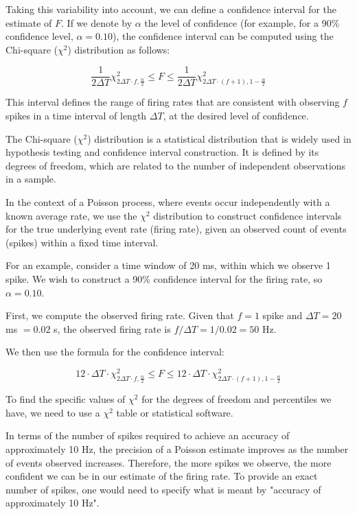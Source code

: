 Taking this variability into account, we can define a confidence interval for the estimate of $F$. If we denote by $\alpha$ the level of confidence (for example, for a 90\% confidence level, $\alpha = 0.10$), the confidence interval can be computed using the Chi-square ($\chi^2$) distribution as follows:

\begin{equation}
\frac{1}{2\Delta T} \chi^{2}_{2\Delta T \cdot f, \frac{\alpha}{2}} \leq F \leq \frac{1}{2\Delta T} \chi^{2}_{2\Delta T \cdot (f+1), 1-\frac{\alpha}{2}}
\end{equation}

This interval defines the range of firing rates that are consistent with observing $f$ spikes in a time interval of length $\Delta T$, at the desired level of confidence.




The Chi-square ($\chi^2$) distribution is a statistical distribution that is widely used in hypothesis testing and confidence interval construction. It is defined by its degrees of freedom, which are related to the number of independent observations in a sample.

In the context of a Poisson process, where events occur independently with a known average rate, we use the $\chi^2$ distribution to construct confidence intervals for the true underlying event rate (firing rate), given an observed count of events (spikes) within a fixed time interval.

For an example, consider a time window of 20 ms, within which we observe 1 spike. We wish to construct a 90\% confidence interval for the firing rate, so $\alpha = 0.10$.

First, we compute the observed firing rate. Given that $f = 1$ spike and $\Delta T = 20$ ms $= 0.02$ s, the observed firing rate is $f/\Delta T = 1 / 0.02 = 50$ Hz.

We then use the formula for the confidence interval:

\begin{equation}
12 \cdot \Delta T \cdot \chi^{2}_{2\Delta T \cdot f, \frac{\alpha}{2}} \leq F \leq 12 \cdot \Delta T \cdot \chi^{2}_{2\Delta T \cdot (f+1), 1-\frac{\alpha}{2}}
\end{equation}

To find the specific values of $\chi^2$ for the degrees of freedom and percentiles we have, we need to use a $\chi^2$ table or statistical software.

In terms of the number of spikes required to achieve an accuracy of approximately 10 Hz, the precision of a Poisson estimate improves as the number of events observed increases. Therefore, the more spikes we observe, the more confident we can be in our estimate of the firing rate. To provide an exact number of spikes, one would need to specify what is meant by "accuracy of approximately 10 Hz".



